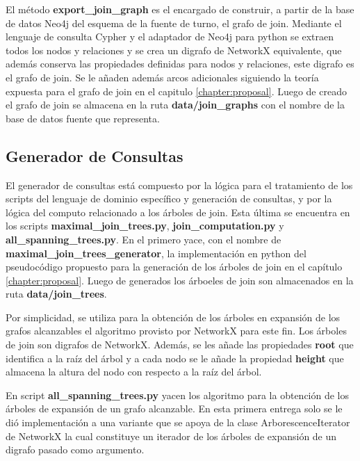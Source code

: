 El m\'etodo \textbf{export\_join\_graph} es el encargado de construir, a partir de la base de datos Neo4j del esquema 
de la fuente de turno, el grafo de join. Mediante el lenguaje de consulta Cypher y el adaptador de Neo4j para python 
se extraen todos los nodos y relaciones y se crea un digrafo de NetworkX equivalente, que adem\'as conserva las 
propiedades definidas para nodos y relaciones, este digrafo es el grafo de join. Se le añaden adem\'as arcos 
adicionales siguiendo la teor\'ia expuesta para el grafo de join en el capitulo \ref{chapter:proposal}. Luego 
de creado el grafo de join se almacena en la ruta \textbf{data/join\_graphs} con el nombre de la base de datos fuente 
que representa.


\subsection{Generador de Consultas}

El generador de consultas est\'a compuesto por la l\'ogica para el tratamiento de los scripts del lenguaje de 
dominio espec\'ifico y generaci\'on de consultas, y por la l\'ogica del computo relacionado a los \'arboles de join. 
Esta \'ultima se encuentra en los scripts \textbf{maximal\_join\_trees.py}, \textbf{join\_computation.py} y 
\textbf{all\_spanning\_trees.py}. En el primero yace, con el nombre de \textbf{maximal\_join\_trees\_generator}, 
la implementaci\'on en python del pseudoc\'odigo propuesto para la generaci\'on de los \'arboles de join en el 
cap\'itulo \ref{chapter:proposal}. Luego de generados los \'arboeles de join son almacenados en la ruta 
\textbf{data/join\_trees}.

Por simplicidad, se utiliza para la obtenci\'on de los \'arboles en expansi\'on de los grafos alcanzables el algoritmo 
provisto por NetworkX para este fin. Los \'arboles de join son digrafos de NetworkX. Adem\'as, se les añade las propiedades 
\textbf{root} que identifica a la ra\'iz del \'arbol y a cada nodo se le añade la propiedad \textbf{height} que almacena 
la altura del nodo con respecto a la ra\'iz del \'arbol.

En script \textbf{all\_spanning\_trees.py} yacen los algoritmo para la obtenci\'on de los \'arboles de expansi\'on 
de un grafo alcanzable. En esta primera entrega solo se le di\'o implementaci\'on a una variante que se apoya de la 
clase ArborescenceIterator de NetworkX la cual constituye un iterador de los \'arboles de expansi\'on de un digrafo 
pasado como argumento.

